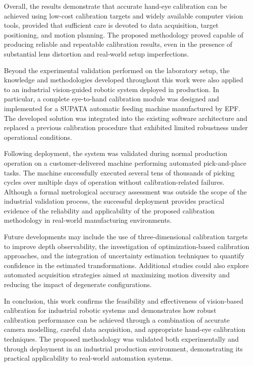 Overall, the results demonstrate that accurate hand-eye calibration can be achieved using low-cost calibration targets and widely available computer vision tools, provided that sufficient care is devoted to data acquisition, target positioning, and motion planning. The proposed methodology proved capable of producing reliable and repeatable calibration results, even in the presence of substantial lens distortion and real-world setup imperfections.

Beyond the experimental validation performed on the laboratory setup, the
knowledge and methodologies developed throughout this work were also applied
to an industrial vision-guided robotic system deployed in production. In
particular, a complete eye-to-hand calibration module was designed and
implemented for a SUPATA automatic feeding machine manufactured by EPF. The
developed solution was integrated into the existing software architecture and
replaced a previous calibration procedure that exhibited limited robustness
under operational conditions.

Following deployment, the system was validated during normal production
operation on a customer-delivered machine performing automated pick-and-place
tasks. The machine successfully executed several tens of thousands of picking
cycles over multiple days of operation without calibration-related failures.
Although a formal metrological accuracy assessment was outside the scope of
the industrial validation process, the successful deployment provides
practical evidence of the reliability and applicability of the proposed
calibration methodology in real-world manufacturing environments.

Future developments may include the use of three-dimensional calibration targets to improve depth observability, the investigation of optimization-based calibration approaches, and the integration of uncertainty estimation techniques to quantify confidence in the estimated transformations. Additional studies could also explore automated acquisition strategies aimed at maximizing motion diversity and reducing the impact of degenerate configurations.

In conclusion, this work confirms the feasibility and effectiveness of
vision-based calibration for industrial robotic systems and demonstrates how
robust calibration performance can be achieved through a combination of
accurate camera modelling, careful data acquisition, and appropriate hand-eye
calibration techniques. The proposed methodology was validated both
experimentally and through deployment in an industrial production
environment, demonstrating its practical applicability to real-world
automation systems.